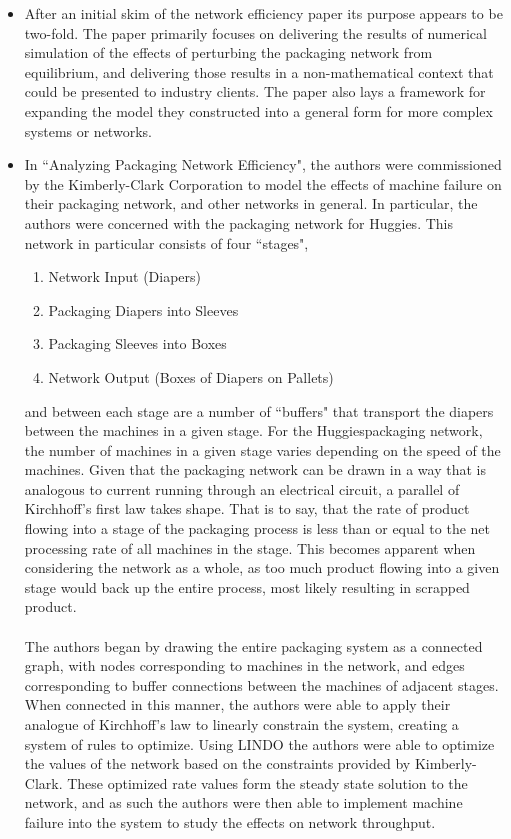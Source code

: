 \documentclass[letterpaper,10pt]{article}
\begin{document}
\begin{itemize}
\item After an initial skim of the network efficiency paper its purpose appears to be two-fold. The paper primarily focuses on delivering the results of numerical simulation of the effects of perturbing the packaging network from equilibrium, and delivering those results in a non-mathematical context that could be presented to industry clients. The paper also lays a framework for expanding the model they constructed into a general form for more complex systems or networks.
\item In ``Analyzing Packaging Network Efficiency", the authors were commissioned by the Kimberly-Clark Corporation to model the effects of machine failure on their packaging network, and other networks in general. In particular, the authors were concerned with the packaging network for Huggies\texttrademark .  This network in particular consists of four ``stages",
\begin{enumerate}
\item Network Input (Diapers)
\item Packaging Diapers into Sleeves
\item Packaging Sleeves into Boxes
\item Network Output (Boxes of Diapers on Pallets)
\end{enumerate}
and between each stage are a number of ``buffers" that transport the diapers between the machines in a given stage. For the Huggies\texttrademark packaging network, the number of machines in a given stage varies depending on the speed of the machines. Given that the packaging network can be drawn in a way that is analogous to current running through an electrical circuit, a parallel of Kirchhoff's first law takes shape. That is to say, that the rate of product flowing into a stage of the packaging process is less than or equal to the net processing rate of all machines in the stage. This becomes apparent when considering the network as a whole, as too much product flowing into a given stage would back up the entire process, most likely resulting in scrapped product.\\\\
The authors began by drawing the entire packaging system as a connected graph, with nodes corresponding to machines in the network, and edges corresponding to buffer connections between the machines of adjacent stages. When connected in this manner, the authors were able to apply their analogue of Kirchhoff's law to linearly constrain the system, creating a system of rules to optimize. Using LINDO the authors were able to optimize the values of the network based on the constraints provided by Kimberly-Clark. These optimized rate values form the steady state solution to the network, and as such the authors were then able to implement machine failure into the system to study the effects on network throughput.\\\\

\end{itemize}
\end{document}
